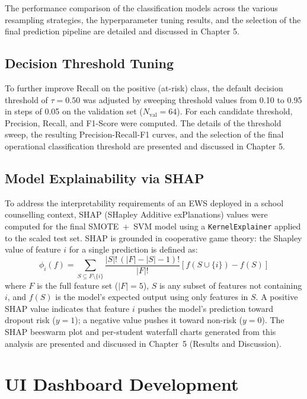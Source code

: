 The performance comparison of the classification models across the various resampling strategies, the hyperparameter tuning results, and the selection of the final prediction pipeline are detailed and discussed in Chapter 5.

\subsection{Decision Threshold Tuning}
\label{subsec:threshold}

To further improve Recall on the positive (at-risk) class, the default decision threshold of $\tau = 0.50$ was adjusted by sweeping threshold values from 0.10 to 0.95 in steps of 0.05 on the validation set ($N_{\text{val}}=64$). For each candidate threshold, Precision, Recall, and F1-Score were computed. The details of the threshold sweep, the resulting Precision-Recall-F1 curves, and the selection of the final operational classification threshold are presented and discussed in Chapter 5.

\subsection{Model Explainability via SHAP}
\label{subsec:shap}

To address the interpretability requirements of an EWS deployed in a school counselling context, SHAP (SHapley Additive exPlanations) values were computed for the final SMOTE~+~SVM model using a \texttt{KernelExplainer} applied to the scaled test set. SHAP is grounded in cooperative game theory: the Shapley value of feature $i$ for a single prediction is defined as:
\begin{equation}
    \phi_i(f) = \sum_{S \subseteq F \setminus \{i\}} \frac{|S|!\,(|F| - |S| - 1)!}{|F|!} \left[ f(S \cup \{i\}) - f(S) \right]
    \label{eq:shap}
\end{equation}
where $F$ is the full feature set ($|F|=5$), $S$ is any subset of features not containing $i$, and $f(S)$ is the model's expected output using only features in $S$. A positive SHAP value indicates that feature $i$ pushes the model's prediction toward dropout risk ($y=1$); a negative value pushes it toward non-risk ($y=0$). The SHAP beeswarm plot and per-student waterfall charts generated from this analysis are presented and discussed in Chapter~5 (Results and Discussion).

\section{UI Dashboard Development}
\label{sec:dashboard}

